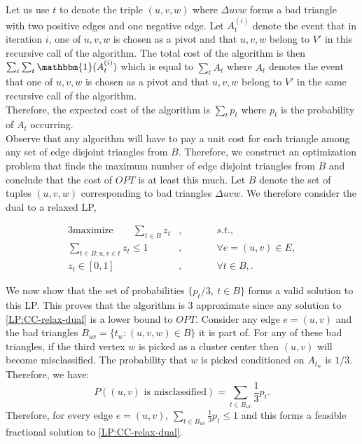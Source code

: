 \noindent Let us use $t$ to denote the triple $(u,v,w)$ where $\Delta uvw$ forms a bad triangle with two positive edges and one negative edge. Let $A_t^{(i)}$ denote the event that in iteration $i$, one of $u,v,w$ is chosen as a pivot and that $u,v,w$ belong to $V'$ in this recursive call of the algorithm. The total cost of the algorithm is then $\sum_i \sum_t \mathbbm{1} (A_t^{(i)})$ which is equal to $\sum_t A_t$ where $A_t$ denotes the event that one of $u,v,w$ is chosen as a pivot and that $u,v,w$ belong to $V'$ in the same recursive call of the algorithm.\\

\noindent Therefore, the expected cost of the algorithm is $\sum_t p_t$ where $p_t$ is the probability of $A_t$ occurring.\\

    \noindent Observe that any algorithm will have to pay a unit cost for each triangle among any set of edge disjoint triangles from $B$. Therefore, we construct an optimization problem that finds the maximum number of edge disjoint triangles from $B$ and conclude that the cost of $OPT$ is at least this much. Let $B$ denote the set of tuples $(u,v,w)$ corresponding to bad triangles $\Delta uvw$. We therefore consider the dual to a relaxed LP,

\begin{alignat}{3} \label{LP:CC-relax-dual}
		\text{maximize} \qquad \sum_{t \in B} z_t &, && \qquad s.t., \nonumber\\
		\sum_{t \in B : u,v \in t} z_t \le 1& , &&\qquad \forall e = (u,v) \in E , \nonumber\\
		z_{t} \in [ 0,1 ]&, &&\qquad \forall t \in B,.\tag{LP1}
\end{alignat}

We now show that the set of probabilities $\{ p_t / 3,\ t \in B \}$ forms a valid solution to this LP. This proves that the algorithm is $3$ approximate since any solution to \ref{LP:CC-relax-dual} is a lower bound to $OPT$. Consider any edge $e = (u,v)$ and the bad triangles $B_{uv} = \{ t_w : (u,v,w) \in B \}$ it is part of. For any of these bad triangles, if the third vertex $w$ is picked as a cluster center then $(u,v)$ will become misclassified. The probability that $w$ is picked conditioned on $A_{t_w}$ is $1/3$. Therefore, we have:
\begin{equation} \label{eq:0000}
    P ( (u,v) \text{ is misclassified}) = \sum_{t \in B_{uv}} \frac{1}{3} p_t.
\end{equation}
Therefore, for every edge $e = (u,v)$, $\sum_{t \in B_{uv}} \frac{1}{3} p_t \le 1$ and this forms a feasible fractional solution to \ref{LP:CC-relax-dual}.

